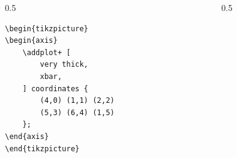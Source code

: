 \documentclass[12pt,aspectratio=169,ignorenonframetext]{ltxbeamer}
\begin{document}
\begin{frame}[fragile]
\bigskip

\begin{columns}
    \begin{column}{0.5\textwidth}
        \begin{verbatim}
\begin{tikzpicture}
\begin{axis}
    \addplot+ [
        very thick,
        xbar,
    ] coordinates {
        (4,0) (1,1) (2,2)
        (5,3) (6,4) (1,5)
    };
\end{axis}
\end{tikzpicture}
        \end{verbatim}
    \end{column}
    {\color{gray} \vline}
    \begin{column}{0.5\textwidth}
    \end{column}
\end{columns}
\end{frame}
\end{document}
